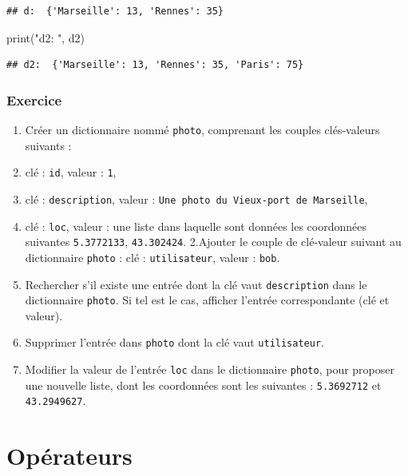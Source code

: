 \documentclass[
  12pt,
]{book}
\makeatletter
\newenvironment{Shaded}{\begin{snugshade}}{\end{snugshade}}
\newcommand{\BuiltInTok}[1]{#1}
\newcommand{\NormalTok}[1]{#1}
\newcommand{\StringTok}[1]{\textcolor[rgb]{0.31,0.60,0.02}{#1}}
\numberwithin{equation}{section}
\numberwithin{countremarque}{section}
\newenvironment{exframe}{%
 \def\at@end@of@exframe{}%
 \ifinner\ifhmode%
  \def\at@end@of@exframe{\end{minipage}}%
  \begin{minipage}{\columnwidth}%
 \fi\fi%
 \def\FrameCommand##1{\hskip\@totalleftmargin \hskip-\fboxsep
 \colorbox{shadecolorex}{##1}\hskip-\fboxsep
     \hskip-\linewidth \hskip-\@totalleftmargin \hskip\columnwidth}%
 \MakeFramed {\advance\hsize-\width
   \@totalleftmargin\z@ \linewidth\hsize
   \@setminipage}}%
 {\par\unskip\endMakeFramed%
 \at@end@of@exframe}
\makeatother
\begin{document}
\begin{lstlisting}
## d:  {'Marseille': 13, 'Rennes': 35}
\end{lstlisting}

\begin{Shaded}
\begin{Highlighting}[]
\BuiltInTok{print}\NormalTok{(}\StringTok{"d2: "}\NormalTok{, d2)}
\end{Highlighting}
\end{Shaded}

\begin{lstlisting}
## d2:  {'Marseille': 13, 'Rennes': 35, 'Paris': 75}
\end{lstlisting}

\subsection{Exercice}\label{exercice-1}

\begin{exframe}
\begin{enumerate}
\def\labelenumi{\arabic{enumi}.}
\item
  Créer un dictionnaire nommé \texttt{photo}, comprenant les couples clés-valeurs suivants :
\item
  clé : \texttt{id}, valeur : \texttt{1},
\item
  clé : \texttt{description}, valeur : \texttt{Une\ photo\ du\ Vieux-port\ de\ Marseille},
\item
  clé : \texttt{loc}, valeur : une liste dans laquelle sont données les coordonnées suivantes \texttt{5.3772133}, \texttt{43.302424}.
  2.Ajouter le couple de clé-valeur suivant au dictionnaire \texttt{photo} : clé : \texttt{utilisateur}, valeur : \texttt{bob}.
\item
  Rechercher s'il existe une entrée dont la clé vaut \texttt{description} dans le dictionnaire \texttt{photo}. Si tel est le cas, afficher l'entrée correspondante (clé et valeur).
\item
  Supprimer l'entrée dans \texttt{photo} dont la clé vaut \texttt{utilisateur}.
\item
  Modifier la valeur de l'entrée \texttt{loc} dans le dictionnaire \texttt{photo}, pour proposer une nouvelle liste, dont les coordonnées sont les suivantes : \texttt{5.3692712} et \texttt{43.2949627}.
\end{enumerate}
\end{exframe}

\chapter{Opérateurs}\label{opuxe9rateurs}
\end{document}
